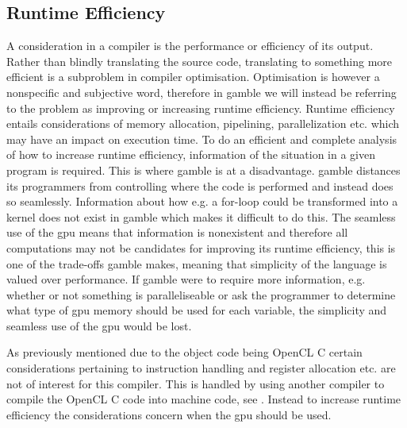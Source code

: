 \subsection*{Runtime Efficiency}\label{subsec:runtime}
A consideration in a compiler is the performance or efficiency of its output. 
Rather than blindly translating the source code, translating to something more efficient is a subproblem in compiler optimisation.
Optimisation is however a nonspecific and subjective word, therefore in \gls{gamble} we will instead be referring to the problem as improving or increasing runtime efficiency.
Runtime efficiency entails considerations of memory allocation, pipelining, parallelization etc. which may have an impact on execution time.
To do an efficient and complete analysis of how to increase runtime efficiency, information of the situation in a given program is required.
This is where \gls{gamble} is at a disadvantage. 
\gls{gamble} distances its programmers from controlling where the code is performed and instead does so seamlessly.
Information about how e.g. a for-loop could be transformed into a kernel does not exist in \gls{gamble} which makes it difficult to do this.
The seamless use of the \acrshort{gpu} means that information is nonexistent and therefore all computations may not be candidates for improving its runtime efficiency, this is one of the trade-offs \gls{gamble} makes, meaning that simplicity of the language is valued over performance.
If \gls{gamble} were to require more information, e.g. whether or not something is paralleliseable or ask the programmer to determine what type of \acrshort{gpu} memory should be used for each variable, the simplicity and seamless use of the \acrshort{gpu} would be lost.

As previously mentioned due to the object code being OpenCL C certain considerations pertaining to instruction handling and register allocation etc. are not of interest for this compiler.
This is handled by using another compiler to compile the OpenCL C code into machine code, see . 
Instead to increase runtime efficiency the considerations concern when the \acrshort{gpu} should be used.

